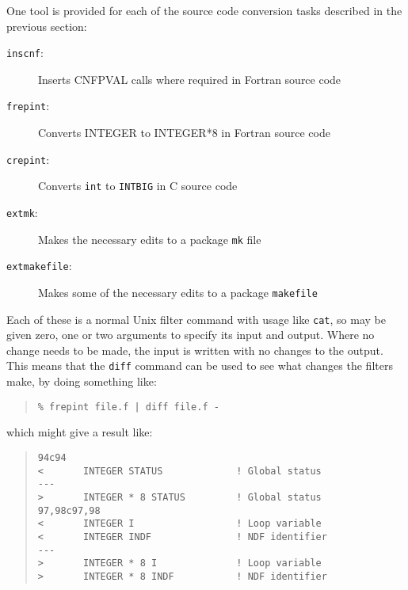 \documentclass[twoside,11pt]{article}
\newcommand{\htmlref}[2]{#1}
\renewcommand{\_}{\texttt{\symbol{95}}}
\newcommand{\xroutine}[1]{\htmlref{{\tt #1}}{#1}}
\newcommand{\file}[1]{{\tt #1}}
\newcommand{\cc}[1]{{\tt #1}}
\newenvironment{squote}{\begin{quote}\begin{small}}{\end{small}\end{quote}}
\begin{document}
One tool is provided for each of the source code conversion
tasks described in the previous section:
\begin{description}
\item[\xroutine{inscnf}:] Inserts CNF\_PVAL calls where required in Fortran source code
\item[\xroutine{frepint}:]
     Converts INTEGER to INTEGER*8 in Fortran source code
\item[\xroutine{crepint}:]
     Converts \cc{int} to \cc{INT\_BIG} in C source code
\item[\xroutine{extmk}:]
     Makes the necessary edits to a package \file{mk} file
\item[\xroutine{extmakefile}:]
     Makes some of the necessary edits to a package \file{makefile}
\end{description}
Each of these is a normal Unix filter command with usage like \file{cat},
so may be given zero, one or two arguments to specify its input and output.
Where no change needs to be made, the input is written with no changes
to the output.  This means that the \file{diff} command can be used
to see what changes the filters make, by doing something like:
\begin{squote}
\begin{verbatim}
% frepint file.f | diff file.f -
\end{verbatim}
\end{squote}
which might give a result like:
\begin{squote}
\begin{verbatim}
94c94
<       INTEGER STATUS             ! Global status
---
>       INTEGER * 8 STATUS         ! Global status
97,98c97,98
<       INTEGER I                  ! Loop variable
<       INTEGER INDF               ! NDF identifier
---
>       INTEGER * 8 I              ! Loop variable
>       INTEGER * 8 INDF           ! NDF identifier
\end{verbatim}
\end{squote}
\end{document}
